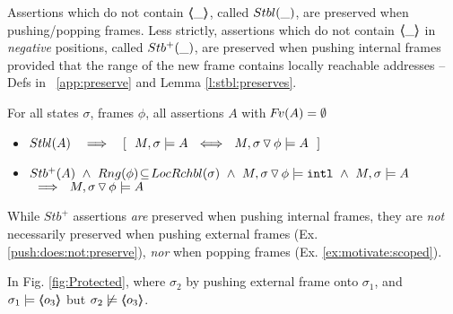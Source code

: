  

{Assertions} which do  not contain  $\langle\!\!\langle \_ \rangle\!\!\rangle$, called   ${Stbl( \_ )}$, are preserved when pushing/popping  frames.  
{Less strictly}, assertions which do  not contain $\langle\!\!\langle \_ \rangle\!\!\rangle$ in \emph{negative} positions, called ${Stb^+( \_ )}$,  are preserved when pushing  {internal} frames provided that the range of the new frame contains locally reachable addresses -- 
\cf  Defs   in \A\ \ref{app:preserve} and Lemma \ref{l:stbl:preserves}.

\begin{lemma}
For all  states $\sigma$, frames $\phi$,   all assertions $A$ with  ${\hspace{-1pt}F\hspace{-1pt}}v(A)=\emptyset $
\label{l:preserve:asrt}
\label{l:stbl:preserves} 
\begin{itemize}
\item 
$\Stable{A} \  \ \  \Longrightarrow  \  \ \  [\ \ M, \sigma \models A \ \ \Longleftrightarrow \ \  M,{\PushSLong \phi \sigma} \models A\ \ ]$
\item 
\label{l:preserve:asrt:two}
${Stb^+( A )}   \ \wedge    \ Rng(\phi)\!\subseteq\! LocRchbl(\sigma)\ \wedge\  M, { \sigma \, {\triangledown}\, \phi} \models  \mbox{\normalfont{\texttt{intl}}}\  \wedge  \ M, \sigma \models A $
$\  \ \Longrightarrow \  \ M,{ \sigma \, {\triangledown}\, \phi} \models A\ $
\end{itemize}
\end{lemma}


While $Stb^+$ assertions \emph{are} preserved  when pushing  internal frames,   they  are \emph{not} necessarily preserved when pushing  external frames   (\cf  Ex. \ref{push:does:not:preserve}), \emph{nor} when popping frames   (\cf Ex. \ref{ex:motivate:scoped}). 

 
\begin{example}
\label{push:does:not:preserve}
In    Fig. \ref{fig:Protected}, where $\sigma_2$ by pushing external frame onto $\sigma_1$, and 
$\sigma_1 \models \langle\!\!\langle o_3 \rangle\!\!\rangle$ but $\sigma_2 \not\models \langle\!\!\langle o_3 \rangle\!\!\rangle$.
\end{example}
 

